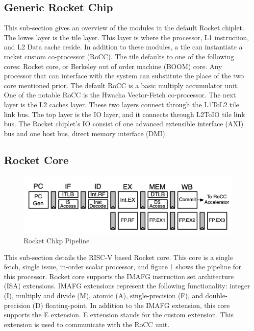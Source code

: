 \documentclass[../main.tex]{subfiles}
\begin{document}
\subsection{Generic Rocket Chip}
This sub-section gives an overview of the modules in the default Rocket chiplet. The lowes layer is the tile layer. This layer is where the processor,  L1 instruction, and L2 Data cache reside. In addition to these modules, a tile can instantiate a rocket custom co-processor (RoCC).  The tile defaults to one of the following cores: Rocket core, or Berkeley out of order machine (BOOM) core. Any processor that can interface with the system can substitute the place of the two core mentioned prior.  The default RoCC is a basic multiply accumulator unit. One of the notable RoCC is the Hwacha Vector-Fetch co-processor\cite{HwachaPaper}. The next layer is the L2 caches layer. These two layers connect through the L1ToL2 tile link bus. The top layer is the IO layer, and it connects through L2ToIO tile link bus. The Rocket chiplet's IO consist of one advanced extensible interface (AXI) bus and one host bus, direct memory interface (DMI). 



\subsection{Rocket Core}
\begin{figure}
    \centering
    \includegraphics[scale=.4]{pngs/RocketPipeline.png}
    \caption{Rocket Chkp Pipeline\cite{Asanović:EECS-2016-17}}
    \label{fig:RocketCipFlow}
\end{figure}
This sub-section details the RISC-V based Rocket core. This core is a single fetch, single issue, in-order scalar processor, and figure \ref{fig:RocketCipFlow} shows the pipeline for this processor. Rocket core supports the IMAFG instruction set architecture (ISA) extensions\cite{Asanović:EECS-2016-17}. IMAFG extensions represent the following functionality: integer (I), multiply and divide (M), atomic (A), single-precision (F), and double-precision (D) floating-point\cite{Asanović:EECS-2016-17}. In addition to the IMAFG extension, this core supports the E extension. E extension stands for the custom extension. This extension is used to communicate with the RoCC unit.
\end{document}
